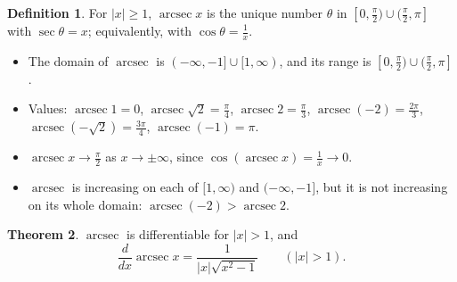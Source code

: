 \documentclass[12pt,letterpaper]{article}
\theoremstyle{definition}
\newtheorem{theorem}{Theorem}[section]
\newtheorem{definition}[theorem]{Definition}
\DeclareMathOperator{\arcsec}{arcsec}
\begin{document}
\begin{definition}
  For $|x|\geq1$, $\arcsec x$ is the unique number $\theta$ in
  $[0,\frac\pi2)\cup(\frac\pi2,\pi]$ with $\sec\theta=x$; equivalently, with
  $\cos\theta=\frac1x$.
\end{definition}

\begin{itemize}[itemsep=0.2em]
  \item The domain of $\arcsec$ is $(-\infty,-1]\cup[1,\infty)$, and its range
    is $[0,\frac\pi2)\cup(\frac\pi2,\pi]$.
  \item Values: $\arcsec1=0$, $\arcsec\sqrt2=\frac\pi4$,
    $\arcsec2=\frac\pi3$, $\arcsec(-2)=\frac{2\pi}{3}$,
    $\arcsec(-\sqrt2)=\frac{3\pi}{4}$, $\arcsec(-1)=\pi$.
  \item $\arcsec x\to\frac\pi2$ as $x\to\pm\infty$, since
    $\cos(\arcsec x)=\frac1x\to0$.
  \item $\arcsec$ is increasing on each of $[1,\infty)$ and $(-\infty,-1]$, but
    it is not increasing on its whole domain: $\arcsec(-2)>\arcsec2$.
\end{itemize}

\begin{center}
\end{center}

\begin{theorem}
  $\arcsec$ is differentiable for $|x|>1$, and
  \[
    \frac{d}{dx}\arcsec x=\frac{1}{|x|\sqrt{x^2-1}}
    \qquad(|x|>1).
  \]
\end{theorem}
\end{document}
